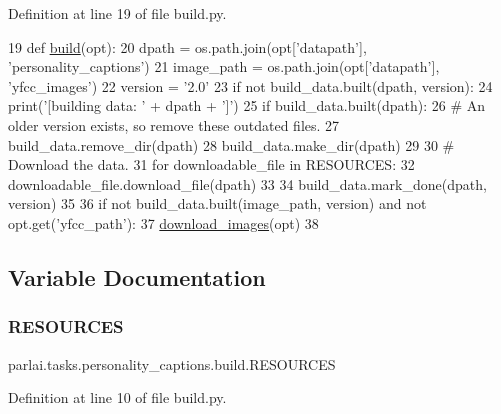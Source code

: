 Definition at line 19 of file build.\+py.


\begin{DoxyCode}
19 \textcolor{keyword}{def }\hyperlink{namespacedialog__babi__feedback_1_1build_a7a9d289f7493a5ded13c4b7f071b6184}{build}(opt):
20     dpath = os.path.join(opt[\textcolor{stringliteral}{'datapath'}], \textcolor{stringliteral}{'personality\_captions'})
21     image\_path = os.path.join(opt[\textcolor{stringliteral}{'datapath'}], \textcolor{stringliteral}{'yfcc\_images'})
22     version = \textcolor{stringliteral}{'2.0'}
23     \textcolor{keywordflow}{if} \textcolor{keywordflow}{not} build\_data.built(dpath, version):
24         print(\textcolor{stringliteral}{'[building data: '} + dpath + \textcolor{stringliteral}{']'})
25         \textcolor{keywordflow}{if} build\_data.built(dpath):
26             \textcolor{comment}{# An older version exists, so remove these outdated files.}
27             build\_data.remove\_dir(dpath)
28         build\_data.make\_dir(dpath)
29 
30         \textcolor{comment}{# Download the data.}
31         \textcolor{keywordflow}{for} downloadable\_file \textcolor{keywordflow}{in} RESOURCES:
32             downloadable\_file.download\_file(dpath)
33 
34         build\_data.mark\_done(dpath, version)
35 
36     \textcolor{keywordflow}{if} \textcolor{keywordflow}{not} build\_data.built(image\_path, version) \textcolor{keywordflow}{and} \textcolor{keywordflow}{not} opt.get(\textcolor{stringliteral}{'yfcc\_path'}):
37         \hyperlink{namespaceparlai_1_1tasks_1_1personality__captions_1_1download__images_a9d812a095ca6d48541b3d5cdc65a4bf3}{download\_images}(opt)
38 \end{DoxyCode}


\subsection{Variable Documentation}
\mbox{\label{namespaceparlai_1_1tasks_1_1personality__captions_1_1build_a01ca1cbf21a409d302ebcc1df913dcbb}} 
\subsubsection{\texorpdfstring{R\+E\+S\+O\+U\+R\+C\+ES}{RESOURCES}}
{\footnotesize\ttfamily parlai.\+tasks.\+personality\+\_\+captions.\+build.\+R\+E\+S\+O\+U\+R\+C\+ES}



Definition at line 10 of file build.\+py.

